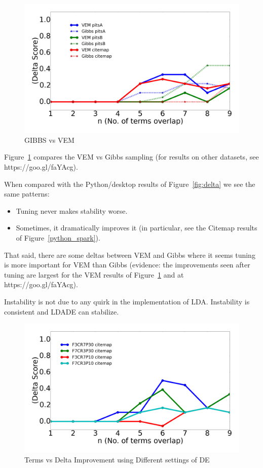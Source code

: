 \documentclass[twocolumn,5p,sort&compress]{elsarticle}
\newcommand{\bi}{\begin{itemize}}
\newcommand{\ei}{\end{itemize}}
\theoremstyle{break}
\begin{document}
\begin{figure}[!htbp]
  \captionsetup{justification=centering}
  \includegraphics[width=\linewidth]{./fig/gibbs_vem1.png}
  \caption{GIBBS vs VEM}
  \label{gibbs_vem}
\end{figure}


  Figure~\ref{gibbs_vem} compares the  VEM vs Gibbs sampling (for results on other datasets, see https://goo.gl/faYAcg).
   
   When compared with the Python/desktop results of
   Figure~\ref{fig:delta} we see the same patterns:
   \bi
 \item Tuning never makes stability worse.
 \item Sometimes, it dramatically improves it (in particular, see the Citemap results
   of  Figure~\ref{python_spark}).
   \ei
   That said, there are some deltas between VEM and Gibbs where it seems tuning
   is more important for VEM than Gibbs (evidence: the improvements seen after
   tuning are largest for the  VEM results of  Figure~\ref{gibbs_vem} and at  https://goo.gl/faYAcg).

\begin{lesson}
  Instability is not due to any quirk in the implementation of LDA. Instability is consistent and LDADE can stabilize. 
\end{lesson}

\begin{figure}[!htbp]
  \includegraphics[width=\linewidth]{./fig/citemap.png}
  \caption{Terms vs Delta Improvement using Different settings of DE}
  \label{fig:RQ4}
\end{figure}
\end{document}
